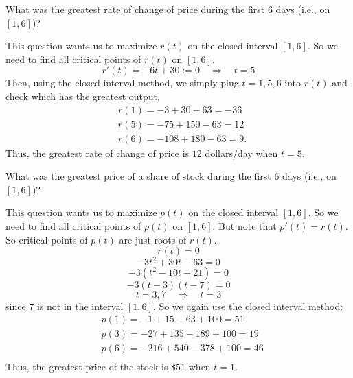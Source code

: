 \documentclass[handout, nooutcomes]{ximera}
\renewenvironment{freeResponse}{
\ifhandout\setbox0\vbox\bgroup\else
\begin{trivlist}\item[\hskip \labelsep\bfseries Solution:\hspace{2ex}]
\fi}
{\ifhandout\egroup\else
\end{trivlist}
\fi}
\begin{document}
\begin{problem}
\begin{enumerate}
	\item  What was the greatest rate of change of price during the first $6$ days (i.e., on $[1,6]$)?
		\begin{freeResponse}
		This question wants us to maximize $r(t)$ on the closed interval $[1,6]$.
		So we need to find all critical points of $r(t)$ on $[1,6]$.
		$$ r'(t) = -6t+30:=0 \quad \Longrightarrow \quad t=5  $$
		Then, using the closed interval method, we simply plug $t=1,5,6$ into $r(t)$ and check which has the greatest output.
			\begin{align*}
			&r(1) = -3+30-63=-36  \\
			&r(5) = -75+150-63=12  \\
			&r(6) = -108+180-63=9.
			\end{align*}
		Thus, the greatest rate of change of price is $12$ dollars/day when $t=5$.
		\end{freeResponse}




	\item  What was the greatest price of a share of stock during the first $6$ days (i.e., on $[1,6]$)?
		\begin{freeResponse}
		This question wants us to maximize $p(t)$ on the closed interval $[1,6]$.
		So we need to find all critical points of $p(t)$ on $[1,6]$.
		But note that $p'(t) = r(t)$.  So critical points of $p(t)$ are just roots of $r(t)$.
		$$ r(t) = 0 $$
		$$ -3t^2+30t-63 = 0 $$
		$$ -3(t^2-10t+21)=0 $$
		$$ -3(t-3)(t-7) = 0 $$
		$$ t=3,7 \quad \Longrightarrow \quad t=3 $$
		since $7$ is not in the interval $[1,6]$.
		So we again use the closed interval method:
			\begin{align*}
			&p(1) = -1+15-63+100 = 51  \\
			&p(3) = -27 + 135 - 189 + 100 = 19  \\
			&p(6) = -216+540-378+100=46  \\
			\end{align*}
		Thus, the greatest price of the stock is $\$51$ when $t=1$.
		\end{freeResponse}
	\end{enumerate}
\end{problem}
\end{document}
